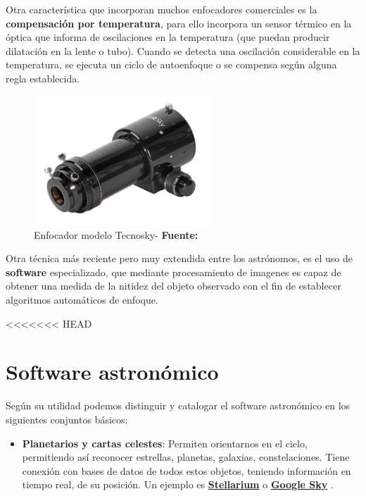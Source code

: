 \begin{itemize}
\begin{itemize}
Otra característica que incorporan muchos enfocadores comerciales es la \textbf{compensación por temperatura}, para ello incorpora un sensor térmico en la óptica que informa de oscilaciones en la temperatura (que puedan producir dilatación en la lente o tubo). Cuando se detecta una oscilación considerable en la temperatura, se ejecuta un ciclo de autoenfoque o se compensa según alguna regla establecida.


\begin{figure}[h!]
	\begin{center}
		\includegraphics[width=0.6\textwidth]{../images/enfocador.jpg}
		\caption[Enfocador modelo Tecnosky]{Enfocador modelo Tecnosky- \textbf{Fuente:} \cite{enfocador_ellunatico}}
		\label{fig:enfocador_tecnosky}
	\end{center}
\end{figure}


Otra técnica más reciente pero muy extendida entre los astrónomos, es el uso de \textbf{software} especializado, que mediante procesamiento de imagenes es capaz de obtener una medida de la nitidez del objeto observado con el fin de establecer algoritmos automáticos de enfoque.

<<<<<<< HEAD

\section{Software astronómico}

Según su utilidad podemos distinguir y catalogar el software astronómico en los siguientes conjuntos básicos:

\begin{itemize}
	\item \textbf{Planetarios y cartas celestes}: Permiten orientarnos en el cielo, permitiendo así reconocer estrellas, planetas, galaxias, constelaciones. Tiene conexión con bases de datos de todos estos objetos, teniendo información en tiempo real, de su posición. Un ejemplo es \href{http://www.stellarium.org/es/}{\textbf{Stellarium}} \cite{stellarium} o \href{https://www.google.com/intl/es_es/sky/}{\textbf{Google Sky}} \cite{gsky}.
	

\end{itemize}
\end{itemize}
\end{itemize}
